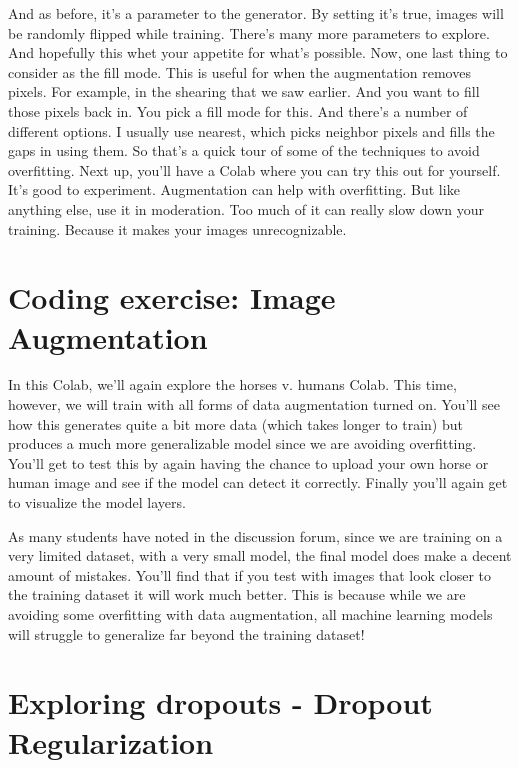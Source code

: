 And as before, it's a parameter to the generator.
By setting it's true, images will be randomly flipped while training.
There's many more parameters to explore.
And hopefully this whet your appetite for what's possible.
Now, one last thing to consider as the fill mode.
This is useful for when the augmentation removes pixels.
For example, in the shearing that we saw earlier.
And you want to fill those pixels back in.
You pick a fill mode for this.
And there's a number of different options.
I usually use nearest, which picks neighbor pixels
and fills the gaps in using them.
So that's a quick tour of some of the techniques to avoid overfitting.
Next up, you'll have a Colab where you can try this out for yourself.
It's good to experiment.
Augmentation can help with overfitting.
But like anything else, use it in moderation.
Too much of it can really slow down your training.
Because it makes your images unrecognizable.

\section{Coding exercise: Image Augmentation}

In this Colab, we’ll again explore the horses v. humans Colab. This time, however, we will train with all forms of data augmentation turned on. You’ll see how this generates quite a bit more data (which takes longer to train) but produces a much more generalizable model since we are avoiding overfitting. You’ll get to test this by again having the chance to upload your own horse or human image and see if the model can detect it correctly. Finally you’ll again get to visualize the model layers.

As many students have noted in the discussion forum, since we are training on a very limited dataset, with a very small model, the final model does make a decent amount of mistakes. You'll find that if you test with images that look closer to the training dataset it will work much better. This is because while we are avoiding some overfitting with data augmentation, all machine learning models will struggle to generalize far beyond the training dataset!



\section{Exploring dropouts - Dropout Regularization}

